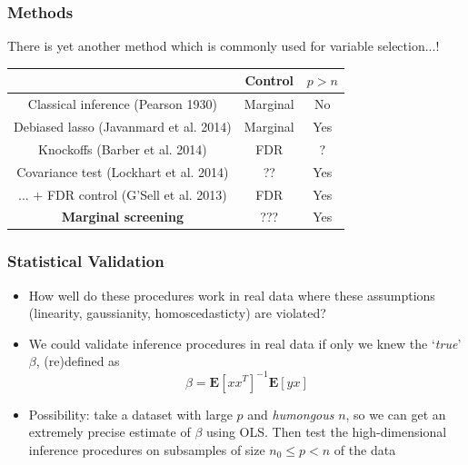 \documentclass{beamer}
\newcommand{\E}{\textbf{E}}
\begin{document}
\begin{frame}
\frametitle{Methods}
There is yet another method which is commonly used for variable selection...!
\begin{center}
\begin{tabular}{|c|c|c|} \hline
 & Control & $p > n$\\ \hline
Classical inference (Pearson 1930) & Marginal & No \\ \hline
Debiased lasso (Javanmard et al. 2014) & Marginal & Yes\\ \hline
Knockoffs (Barber et al. 2014) & FDR & ? \\ \hline
Covariance test (Lockhart et al. 2014) &  ?? & Yes \\
... + FDR control (G'Sell et al. 2013) &  FDR & Yes \\ \hline
\textbf{Marginal screening} & ??? & Yes \\ \hline
\end{tabular}
\end{center}
\end{frame}


\begin{frame}
\frametitle{Statistical Validation}
\begin{itemize}
\item<1-> How well do these procedures work in real data where these assumptions (linearity, gaussianity, homoscedasticty) are violated?
\item<1-> We could validate inference procedures in real data if only we knew the `\emph{true}' $\beta$, (re)defined as
\[
\beta = \E[x x^T]^{-1} \E[yx]
\]
\item<2-> Possibility: take a dataset with large $p$ and
  \emph{humongous} $n$, so we can get an extremely precise estimate of
  $\beta$ using OLS. Then test the high-dimensional inference
  procedures on subsamples of size $n_0 \leq p < n$ of the data
\end{itemize}
\end{frame}
\end{document}
